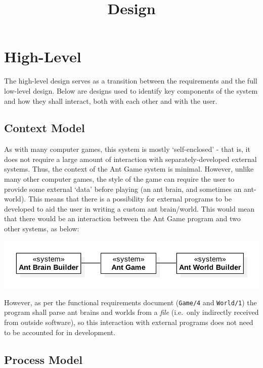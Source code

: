 \documentclass[11pt]{article}
\title{Design}
\date{}
\begin{document}
\maketitle
\tableofcontents
\newpage

\section{High-Level}\label{high-level}

The high-level design serves as a transition between the requirements
and the full low-level design. Below are designs used to identify key
components of the system and how they shall interact, both with each
other and with the user.

\subsection{Context Model}\label{context-model}

As with many computer games, this system is mostly `self-enclosed' -
that is, it does not require a large amount of interaction with
separately-developed external systems. Thus, the context of the Ant Game
system is minimal. However, unlike many other computer games, the style
of the game can require the user to provide some external `data' before
playing (an ant brain, and sometimes an ant-world). This means that
there is a possibility for external programs to be developed to aid the
user in writing a custom ant brain/world. This would mean that there
would be an interaction between the Ant Game program and two other
systems, as below:

\begin{center}
\includegraphics{high-level-diagrams/context-model.png}
\end{center}

However, as per the functional requirements document (\texttt{Game/4}
and \texttt{World/1}) the program shall parse ant brains and worlds from
a \emph{file} (i.e.~only indirectly received from outside software), so
this interaction with external programs does not need to be accounted
for in development.

\subsection{Process Model}\label{process-model}
\end{document}
